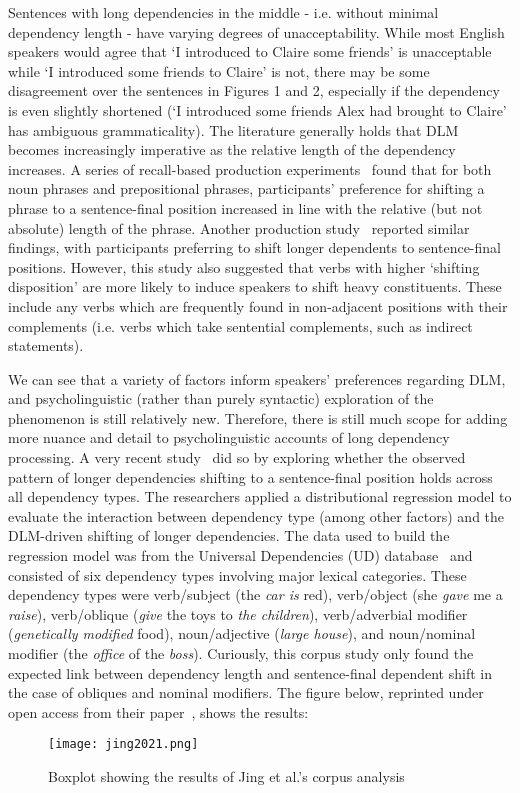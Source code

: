 \documentclass{article}
\begin{document}
Sentences with long dependencies in the middle - i.e. without minimal dependency length - have varying degrees of unacceptability. While most English speakers would agree that `I introduced to Claire some friends' is unacceptable while `I introduced some friends to Claire' is not, there may be some disagreement over the sentences in Figures 1 and 2, especially if the dependency is even slightly shortened (`I introduced some friends Alex had brought to Claire' has ambiguous grammaticality). The literature generally holds that DLM becomes increasingly imperative as the relative length of the dependency increases. A series of recall-based production experiments~\cite{stallings2011} found that for both noun phrases and prepositional phrases, participants' preference for shifting a phrase to a sentence-final position increased in line with the relative (but not absolute) length of the phrase. Another production study~\cite{stallings1998} reported similar findings, with participants preferring to shift longer dependents to sentence-final positions. However, this study also suggested that verbs with higher `shifting disposition' are more likely to induce speakers to shift heavy constituents. These include any verbs which are frequently found in non-adjacent positions with their complements (i.e. verbs which take sentential complements, such as indirect statements).

We can see that a variety of factors inform speakers' preferences regarding DLM, and psycholinguistic (rather than purely syntactic) exploration of the phenomenon is still relatively new. Therefore, there is still much scope for adding more nuance and detail to psycholinguistic accounts of long dependency processing. A very recent study~\cite{jing2021} did so by exploring whether the observed pattern of longer dependencies shifting to a sentence-final position holds across all dependency types. The researchers applied a distributional regression model to evaluate the interaction between dependency type (among other factors) and the DLM-driven shifting of longer dependencies. The data used to build the regression model was from the Universal Dependencies (UD) database~\cite{nivre2020} and consisted of six dependency types involving major lexical categories. These dependency types were verb/subject (the \textit{car is} red), verb/object (she \textit{gave} me a \textit{raise}), verb/oblique (\textit{give} the toys to \textit{the children}), verb/adverbial modifier (\textit{genetically modified} food), noun/adjective (\textit{large house}), and noun/nominal modifier (the \textit{office} of the \textit{boss}). Curiously, this corpus study only found the expected link between dependency length and sentence-final dependent shift in the case of obliques and nominal modifiers. The figure below, reprinted under open access from their paper~\cite{jing2021}, shows the results:
\begin{figure}[H]
	\centering
	\texttt{[image: jing2021.png]}
	\caption{Boxplot showing the results of Jing et al.'s corpus analysis}
	\label{fig:fig3}
\end{figure}
\end{document}
